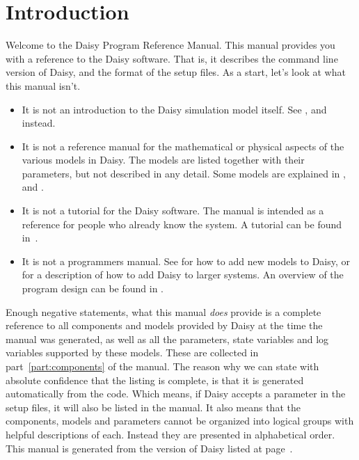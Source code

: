 
\chapter{Introduction}
\label{cha:introduction}

Welcome to the Daisy Program Reference Manual.  This manual provides
you with a reference to the Daisy software.  That is, it describes the
command line version of Daisy, and the format of the setup files.  As
a start, let's look at what this manual isn't.
\begin{itemize}
\item It is not an introduction to the Daisy simulation model itself.
  See \cite{daisy-new}, \cite{daisy-def} and \cite{daisy-fertilizer}
  instead.
\item It is not a reference manual for the mathematical or physical
  aspects of the various models in Daisy.  The models are listed
  together with their parameters, but not described in any detail.
  Some models are explained in \cite{daisy-new}, \cite{daisy-def} and
  \cite{daisy-fertilizer}. 
\item It is not a tutorial for the Daisy software.  The manual is
  intended as a reference for people who already know the system.  A
  tutorial can be found in~\cite{daisy-tut}.
\item It is not a programmers manual.  See \cite{daisy-guide} for how
  to add new models to Daisy, or \cite{c-api} for a description of how
  to add Daisy to larger systems.  An overview of the program design
  can be found in \cite{daisy-ems}.
\end{itemize}

Enough negative statements, what this manual \emph{does} provide is a
complete reference to all components and models provided by Daisy at
the time the manual was generated, as well as all the parameters,
state variables and log variables supported by these models.  These
are collected in part~\ref{part:components} of the manual.  The reason
why we can state with absolute confidence that the listing is
complete, is that it is generated automatically from the code.  Which
means, if Daisy accepts a parameter in the setup files, it will also
be listed in the manual.  It also means that the components, models
and parameters cannot be organized into logical groups with helpful
descriptions of each.  Instead they are presented in alphabetical order.
This manual is generated from the version of Daisy listed at
page~\pageref{version}.

